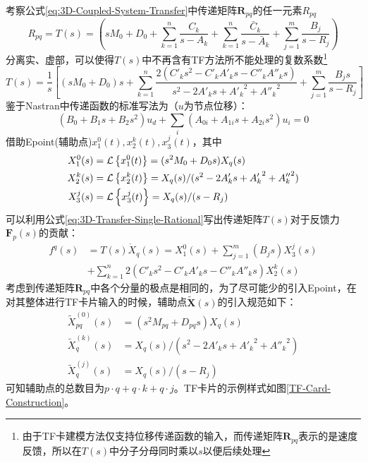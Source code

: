 考察公式\eqref{eq:3D-Coupled-System-Transfer}中传递矩阵$\boldsymbol{R}_{pq}$的任一元素$R_{pq}$
\begin{equation}
	R_{pq}=T(s)=\left( sM_0 + D_0 + \sum_{k=1}^n \frac{C_k}{s-A_k}+ \sum_{k=1}^{n}\frac{\bar{C}_k}{s-\bar{A}_k} + \sum_{j=1}^{m} \frac{B_j}{s-R_j} \right) 
\end{equation}
分离实、虚部，可以使得$T(s)$中不再含有TF方法所不能处理的复数系数\footnote{由于TF卡建模方法仅支持位移传递函数的输入，而传递矩阵$\boldsymbol{R}_{pq}$表示的是速度反馈，所以在$T(s)$中分子分母同时乘以$s$以便后续处理}
\begin{equation}
	\label{eq:3D-Transfer-Single-Rational}
	T(s)=\frac{1}{s} \left[ (sM_0+D_0)s+ \sum_{k=1}^{n} \frac{2(C'_ks^2-C'_kA'_k s-C''_kA''_k s)}{s^2-2A'_ks+{A'_k}^{2}+{A''_k}^2}+\sum_{j=1}^m \frac{B_js}{s-R_j} \right]
\end{equation}
鉴于Nastran中传递函数的标准写法为（$u$为节点位移）：
\begin{equation}
	\label{eq:Standard-Nastran-TF}
	(B_0+B_1s+B_2s^2)u_d+\sum_i (A_{0i}+A_{1i}s+ A_{2i}s^2)u_i=0
\end{equation}
借助Epoint(辅助点)$x_1^0(t),x_{2}^k(t),x_{3}^j(t)$，其中
\begin{equation}
	\label{eq:Epoint-Relationship}
	\begin{aligned}
		X_1^0(s)&=\Laplace{x_1^0(t)}= (s^2M_0+D_0s)X_q(s) \\
		X_{2}^k(s)&=\Laplace{x_2^k(t)}= X_q(s)/(s^2-2A'_ks+{A'_k}^2+{A''_k}^2)\\
		X_{3}^j(s)&=\Laplace{x_3^j(t)}= X_q(s)/(s-R_j)
	\end{aligned}
\end{equation}
可以利用公式\eqref{eq:3D-Transfer-Single-Rational}写出传递矩阵$T(s)$对于反馈力$\boldsymbol{F}_p(s)$的贡献：
\begin{equation}
	\label{eq:Quasi-Structural-Epoint}
	\begin{aligned}
		f^{q}(s)&= T(s)\dot{X}_q(s) =X_1^0(s) + \sum_{j=1}^m (B_js)X_3^{j}(s) \\
		&+\sum_{k=1}^n 2(C'_k s^2- C'_k A'_k s- C''_k A''_ks)X_2^{k}(s)
	\end{aligned}
\end{equation}
考虑到传递矩阵$\boldsymbol{R}_{pq}$中各个分量的极点是相同的，为了尽可能少的引入Epoint，在对其整体进行TF卡片输入的时候，辅助点$\tilde{\boldsymbol{X}}(s)$的引入规范如下：
\begin{equation}
	\label{eq:General-Epoint-Relationship}
	\begin{aligned}
		{\tilde{X}}_{pq}^{(0)}(s)&=(s^2M_{pq}+D_{pq}s)X_q(s) \\
		{\tilde{X}}_{q}^{(k)}(s)&=X_q(s)/(s^2-2A'_ks+{A'_k}^2+{A''_k}^2)\\
		{\tilde{X}}_{q}^{(j)}(s)&=X_q(s)/(s-R_j)
	\end{aligned}
\end{equation}
可知辅助点的总数目为$p\cdot q+ q\cdot k+ q\cdot j$。TF卡片的示例样式如图\ref{TF-Card-Construction}。

